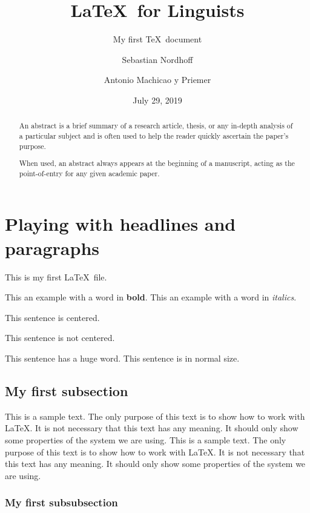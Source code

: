 \documentclass[10pt, paper=a4, abstracton]{scrartcl}
\author{Sebastian Nordhoff \and Antonio Machicao y Priemer}
\title{\LaTeX\ for Linguists}
\subtitle{My first \TeX\ document}
\date{July 29, 2019}
\begin{document}
\maketitle

\tableofcontents

\newpage

\begin{abstract}
	An abstract is a brief summary of a research article, thesis, or any in-depth 
	analysis of a particular subject and is often used to help the reader quickly 
	ascertain the paper's purpose.\par 
	When used, an abstract always appears at the beginning of a manuscript, acting 
	as the point-of-entry for any given academic paper. 
\end{abstract}


\section[Headlines and paragraphs]{Playing with headlines and paragraphs}

This is my first \LaTeX\ file. 

This an example with a word in \textbf{bold}. This an example with a word in \textit{italics}.

\begin{center}
	This sentence is centered.
\end{center}

This sentence is not centered. 

This sentence has a {\Huge huge} word. This sentence is in normal size.


\subsection[First subsection]{My first subsection}

This is a sample text. The only purpose of this text is to show how to work with \LaTeX . It is not necessary that this text has any meaning. It should only show some properties of the system we are using. This is a sample text. The only purpose of this text is to show how to work with \LaTeX . It is not necessary that this text has any meaning. It should only show some properties of the system we are using. 


\subsubsection[First subsubsection]{My first subsubsection}
\end{document}
